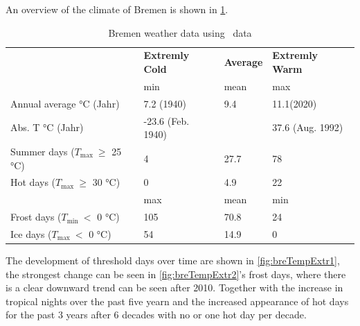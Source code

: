 \documentclass[12pt,a4paper, english,twoside]{scrartcl}
\begin{document}
      An overview of the climate of Bremen is shown in \cref{tab:statsBremen}.
      \begin{table}[ht]
        \centering
        \caption{Bremen weather data using~\autocite{DWD2024a} data\label{tab:statsBremen}}
        \renewcommand{\arraystretch}{1.4}
        \begin{tabular}{p{3.5cm}p{2.5cm}lp{2.5cm}}
          \toprule
          & \textbf{Extremly Cold} & \textbf{Average} & \textbf{Extremly Warm} \\
          & min & mean & max \\
          \midrule
          Annual average °C \newline (Jahr)     &   7.2 \newline(1940)       & 9.4    & 11.1\newline (2020)      \\
          Abs. T °C \newline (Jahr)             & -23.6 \newline(Feb. 1940)  &        & 37.6 \newline(Aug. 1992) \\
          Summer days \newline($T_{\max}~\ge$  25 °C) & 4                    & 27.7   & 78 \\
          Hot days \newline($T_{\max}~\ge$  30 °C)    & 0                    & 4.9    & 22 \\
          \midrule
          & max & mean & min \\
          \midrule
          Frost days \newline($T_{\min}~<$  0 °C)     & 105         & 70.8   & 24 \\
          Ice days \newline($T_{\max}~<$  0 °C)       & 54          & 14.9   & 0  \\
          \bottomrule
        \end{tabular}
      \end{table}
      The development of threshold days over time are shown in \cref{fig:breTempExtr1}, the strongest change can be seen in \cref{fig:breTempExtr2}'s frost days, where there is a clear downward trend can be seen after 2010. 
      Together with the increase in tropical nights over the past five yearn and the increased appearance of hot days for the past 3 years after 6 decades with no or one hot day per decade.
\end{document}
